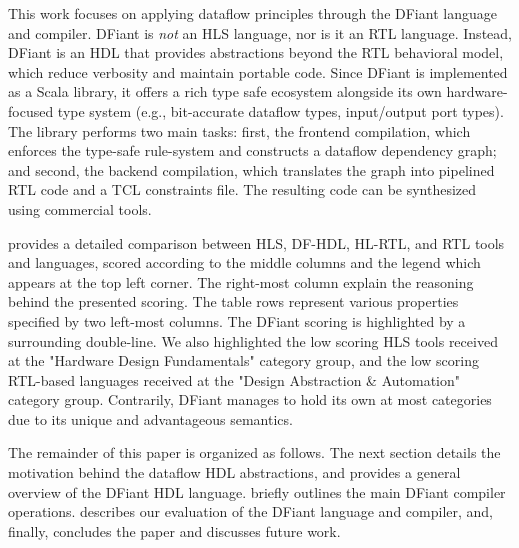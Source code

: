 This work focuses on applying dataflow principles through the DFiant language and compiler. DFiant is \emph{not} an HLS language, nor is it an RTL language. Instead, DFiant is an HDL that provides abstractions beyond the RTL behavioral model, which reduce verbosity and maintain portable code. Since DFiant is implemented as a Scala library, it offers a rich type safe ecosystem alongside its own hardware-focused type system (e.g., bit-accurate dataflow types, input/output port types). The library performs two main tasks: first, the frontend compilation, which enforces the type-safe rule-system and constructs a dataflow dependency graph; and second, the backend compilation, which translates the graph into pipelined RTL code and a TCL constraints file. The resulting code can be synthesized using commercial tools. 

 provides a detailed comparison between HLS, DF-HDL, HL-RTL, and RTL tools and languages, scored according to the middle columns and the legend which appears at the top left corner. The right-most column explain the reasoning behind the presented scoring. The table rows represent various properties specified by two left-most columns. The DFiant scoring is highlighted by a surrounding double-line. We also highlighted the low scoring HLS tools received at the "Hardware Design Fundamentals" category group, and the low scoring RTL-based languages received at the "Design Abstraction \& Automation" category group. Contrarily, DFiant manages to hold its own at most categories due to its unique and advantageous semantics.

The remainder of this paper is organized as follows. The next section details the motivation behind the dataflow HDL abstractions, and  provides a general overview of the DFiant HDL language. 
 briefly outlines the main DFiant compiler operations.
 describes our evaluation of the DFiant language and compiler, and, finally,  concludes the paper and discusses future work.

 